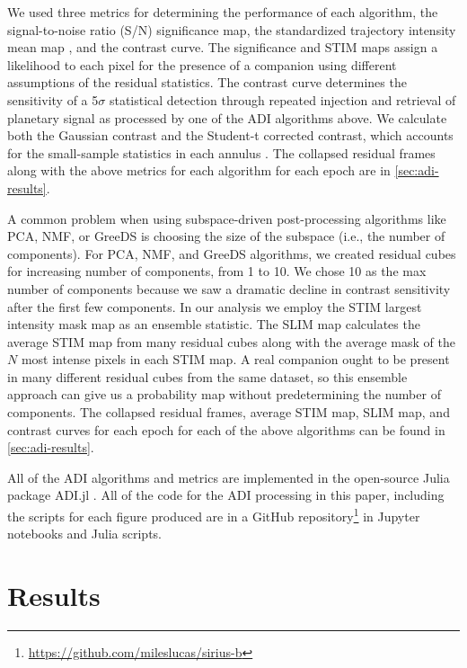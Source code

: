 \documentclass[twocolumn]{aastex631}
\begin{document}
We used three metrics for determining the performance of each algorithm, the signal-to-noise ratio (S/N) significance map, the standardized trajectory intensity mean map \citep[STIM map;][]{pairet_stim_2019}, and the contrast curve. The significance and STIM maps assign a likelihood to each pixel for the presence of a companion using different assumptions of the residual statistics. The contrast curve determines the sensitivity of a 5$\sigma$ statistical detection through repeated injection and retrieval of planetary signal as processed by one of the ADI algorithms above. We calculate both the Gaussian contrast and the Student-t corrected contrast, which accounts for the small-sample statistics in each annulus \citep{mawet_fundamental_2014}. The collapsed residual frames along with the above metrics for each algorithm for each epoch are in \autoref{sec:adi-results}.

A common problem when using subspace-driven post-processing algorithms like PCA, NMF, or GreeDS is choosing the size of the subspace (i.e., the number of components). For PCA, NMF, and GreeDS algorithms, we created residual cubes for increasing number of components, from 1 to 10. We chose 10 as the max number of components because we saw a dramatic decline in contrast sensitivity after the first few components. In our analysis we employ the STIM largest intensity mask map \citep[SLIM map;][]{pairet_signal_2020} as an ensemble statistic. The SLIM map calculates the average STIM map from many residual cubes along with the average mask of the $N$ most intense pixels in each STIM map. A real companion ought to be present in many different residual cubes from the same dataset, so this ensemble approach can give us a probability map without predetermining the number of components. The collapsed residual frames, average STIM map, SLIM map, and contrast curves for each epoch for each of the above algorithms can be found in \autoref{sec:adi-results}. 

All of the ADI algorithms and metrics are implemented in the open-source Julia package ADI.jl \citep{lucas_adijl_2020}. All of the code for the ADI processing in this paper, including the scripts for each figure produced are in a GitHub repository\footnote{\href{https://github.com/mileslucas/sirius-b}{https://github.com/mileslucas/sirius-b}} in Jupyter notebooks and Julia scripts.

\section{Results} \label{sec:results}
\end{document}
